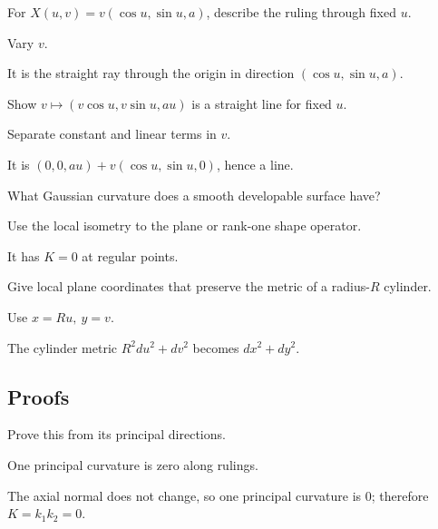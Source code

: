 \begin{exercise}\label{exr:vii18-ped-02}
For \(X(u,v)=v(\cos u,\sin u,a)\), describe the ruling through fixed \(u\).
\end{exercise}
\begin{hint}
Vary \(v\).
\end{hint}
\begin{solution}
It is the straight ray through the origin in direction \((\cos u,\sin u,a)\).
\end{solution}

\begin{exercise}\label{exr:vii18-ped-03}
Show \(v\mapsto(v\cos u,v\sin u,au)\) is a straight line for fixed \(u\).
\end{exercise}
\begin{hint}
Separate constant and linear terms in \(v\).
\end{hint}
\begin{solution}
It is \((0,0,au)+v(\cos u,\sin u,0)\), hence a line.
\end{solution}

\begin{exercise}\label{exr:vii18-ped-04}
What Gaussian curvature does a smooth developable surface have?
\end{exercise}
\begin{hint}
Use the local isometry to the plane or rank-one shape operator.
\end{hint}
\begin{solution}
It has \(K=0\) at regular points.
\end{solution}

\begin{exercise}\label{exr:vii18-ped-05}
Give local plane coordinates that preserve the metric of a radius-\(R\) cylinder.
\end{exercise}
\begin{hint}
Use \(x=Ru,\ y=v\).
\end{hint}
\begin{solution}
The cylinder metric \(R^2du^2+dv^2\) becomes \(dx^2+dy^2\).
\end{solution}

\subsection*{Proofs}

\begin{exercise}\label{exr:vii18-ped-06}
Prove this from its principal directions.
\end{exercise}
\begin{hint}
One principal curvature is zero along rulings.
\end{hint}
\begin{solution}
The axial normal does not change, so one principal curvature is \(0\); therefore \(K=k_1k_2=0\).
\end{solution}

